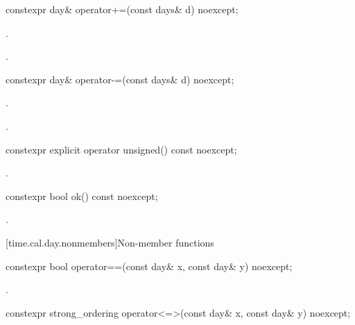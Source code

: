 %
\begin{itemdecl}
constexpr day& operator+=(const days& d) noexcept;
\end{itemdecl}

\begin{itemdescr}
\pnum
\effects
{}.

\pnum
\returns
{}.
\end{itemdescr}

%
\begin{itemdecl}
constexpr day& operator-=(const days& d) noexcept;
\end{itemdecl}

\begin{itemdescr}
\pnum
\effects
{}.

\pnum
\returns
{}.
\end{itemdescr}

%
\begin{itemdecl}
constexpr explicit operator unsigned() const noexcept;
\end{itemdecl}

\begin{itemdescr}
\pnum
\returns
{}.
\end{itemdescr}

%
\begin{itemdecl}
constexpr bool ok() const noexcept;
\end{itemdecl}

\begin{itemdescr}
\pnum
\returns
{}.
\end{itemdescr}

[time.cal.day.nonmembers]{Non-member functions}

%
\begin{itemdecl}
constexpr bool operator==(const day& x, const day& y) noexcept;
\end{itemdecl}

\begin{itemdescr}
\pnum
\returns
{}.
\end{itemdescr}

%
\begin{itemdecl}
constexpr strong_ordering operator<=>(const day& x, const day& y) noexcept;
\end{itemdecl}

